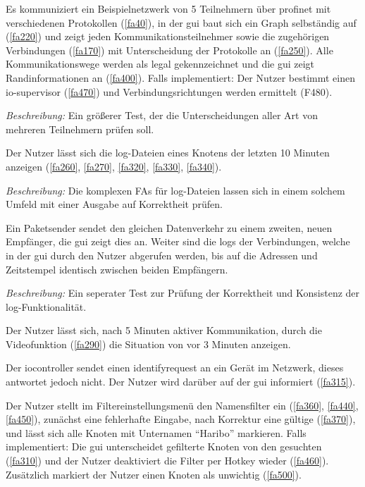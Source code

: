 \begin{description}[style=multiline, leftmargin=4cm, labelwidth=4cm]
   Es kommuniziert ein Beispielnetzwerk von 5 Teilnehmern über \gls{profinet} mit verschiedenen Protokollen (\ref{fa40}), in der \gls{gui} baut sich ein Graph selbständig auf (\ref{fa220}) und zeigt jeden Kommunikationsteilnehmer sowie die zugehörigen Verbindungen (\ref{fa170}) mit Unterscheidung der Protokolle an (\ref{fa250}). Alle Kommunikationswege werden als legal gekennzeichnet und die \gls{gui} zeigt Randinformationen an (\ref{fa400}). Falls implementiert: Der Nutzer bestimmt einen \gls{io-supervisor} (\ref{fa470}) und Verbindungsrichtungen werden ermittelt (F480). \par
      \textit{Beschreibung:} Ein größerer Test, der die Unterscheidungen aller Art von mehreren Teilnehmern prüfen soll.

   Der Nutzer lässt sich die \gls{log}-Dateien eines Knotens der letzten 10 Minuten anzeigen (\ref{fa260}, \ref{fa270}, \ref{fa320}, \ref{fa330}, \ref{fa340}). \par
      \textit{Beschreibung:} Die komplexen FAs für \gls{log}-Dateien lassen sich in einem solchem Umfeld mit einer Ausgabe auf Korrektheit prüfen.

   Ein Paketsender sendet den gleichen Datenverkehr zu einem zweiten, neuen Empfänger, die \gls{gui} zeigt dies an. Weiter sind die \glspl{log} der Verbindungen, welche in der \gls{gui} durch den Nutzer abgerufen werden, bis auf die Adressen und Zeitstempel identisch zwischen beiden Empfängern. \par
      \textit{Beschreibung:} Ein seperater Test zur Prüfung der Korrektheit und Konsistenz der \gls{log}-Funktionalität.

   Der Nutzer lässt sich, nach 5 Minuten aktiver Kommunikation, durch die Videofunktion (\ref{fa290}) die Situation von vor 3 Minuten anzeigen.

   Der \gls{iocontroller} sendet einen \gls{identifyrequest} an ein Gerät im Netzwerk, dieses antwortet jedoch nicht. Der Nutzer wird darüber auf der \gls{gui} informiert (\ref{fa315}).

   Der Nutzer stellt im Filtereinstellungsmenü den Namensfilter ein (\ref{fa360}, \ref{fa440}, \ref{fa450}), zunächst eine fehlerhafte Eingabe, nach Korrektur eine gültige (\ref{fa370}), und lässt sich alle Knoten mit Unternamen “Haribo” markieren. Falls implementiert: Die \gls{gui} unterscheidet gefilterte Knoten von den gesuchten (\ref{fa310}) und der Nutzer deaktiviert die Filter per Hotkey wieder (\ref{fa460}). Zusätzlich markiert der Nutzer einen Knoten als unwichtig (\ref{fa500}).


\end{description}
